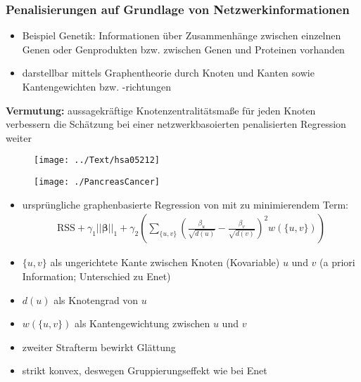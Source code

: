 \documentclass{beamer}
\begin{document}
\begin{frame}
\frametitle{Penalisierungen auf Grundlage von Netzwerkinformationen}
	\begin{itemize}
	\item  Beispiel Genetik: Informationen über Zusammenhänge zwischen einzelnen Genen oder Genprodukten bzw. zwischen Genen und Proteinen vorhanden
	\item darstellbar mittels Graphentheorie durch Knoten und Kanten sowie Kantengewichten bzw. -richtungen
	\end{itemize}
	\textbf{Vermutung:} aussagekräftige Knotenzentralitätsmaße für jeden Knoten verbessern die Schätzung bei einer netzwerkbasoierten penalisierten Regression weiter
\end{frame}

\begin{frame}
\begin{figure}
\centering
\texttt{[image: ../Text/hsa05212]}
\label{fig:hsa05212}
\end{figure}
\end{frame}


\begin{frame}
\begin{figure}
\centering
\texttt{[image: ./PancreasCancer]}
\label{fig:pancreas}
\end{figure}
\end{frame}

\begin{frame}
	\begin{itemize}
	\item ursprüngliche graphenbasierte Regression von \cite{li_network-constrained_2008} mit zu minimierendem Term:
	\begin{align*}
	\text{RSS}
	+\gamma_1||\boldsymbol{\beta}||_1
	+\gamma_2 \left( \sum_{\{u,v\}} \left(\frac{\beta_u}{\sqrt{d(u)}}-\frac{\beta_v}{\sqrt{d(v)}}\right)^2 w(\{u,v\})\right)
	\end{align*}
	\item $\{u,v\}$ als ungerichtete Kante zwischen Knoten (Kovariable) $u$ und $v$ (a priori Information; Unterschied zu Enet)
	\item $d(u)$ als Knotengrad von $u$
	\item $w(\{u,v\})$ als Kantengewichtung zwischen $u$ und $v$
	\item zweiter Strafterm bewirkt Glättung
	\item strikt konvex, deswegen Gruppierungseffekt wie bei Enet
	\end{itemize}
\end{frame}
\end{document}
